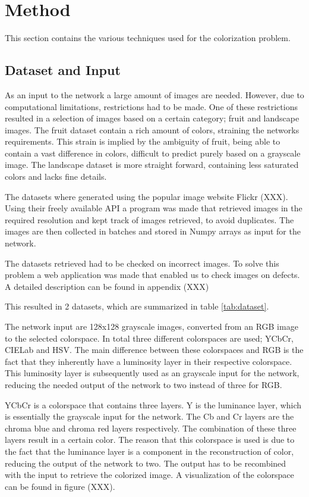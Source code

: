 \section{Method}
This section contains the various techniques used for the colorization problem. %
\subsection{Dataset and Input}

As an input to the network a large amount of images are needed. However, due to computational limitations, restrictions had to be made. One of these restrictions resulted in a selection of images based on a certain category; fruit and landscape images. The fruit dataset contain a rich amount of colors, straining the networks requirements. This strain is implied by the ambiguity %
of fruit, being able to contain a vast difference in colors, difficult to predict purely based on a grayscale image. The landscape dataset is more straight forward, containing less saturated colors and lacks fine details.

The datasets where generated using the popular image website Flickr (XXX). Using their freely available API a program was made that retrieved images in the required resolution and kept track of images retrieved, to avoid duplicates. The images are then collected in batches and stored in Numpy arrays as input for the network. %

The datasets retrieved had to be checked on incorrect images. To solve this problem a web application was made that enabled us to check images on defects. A detailed description can be found in appendix (XXX)

This resulted in 2 datasets, which are summarized in table \ref{tab:dataset}.

The network input are 128x128 grayscale images, converted from an RGB image to the selected colorspace. In total three different colorspaces are used; YCbCr, CIELab and HSV. The main difference between these colorspaces and RGB is the fact that they inherently have a luminosity layer in their respective colorspace. This luminosity layer is subsequently used as an grayscale input for the network, reducing the needed output of the network to two instead of three for RGB. 

YCbCr is a colorspace that contains three layers. Y is the luminance layer, which is essentially the grayscale input for the network. The Cb and Cr layers are the chroma blue and chroma red layers respectively. The combination of these three layers result in a certain color. The reason that this colorspace is used is due to the fact that the luminance layer is a component in the reconstruction of color, reducing the output of the network to two. The output has to be recombined with the input to retrieve the colorized image. A visualization of the colorspace can be found in figure (XXX).

